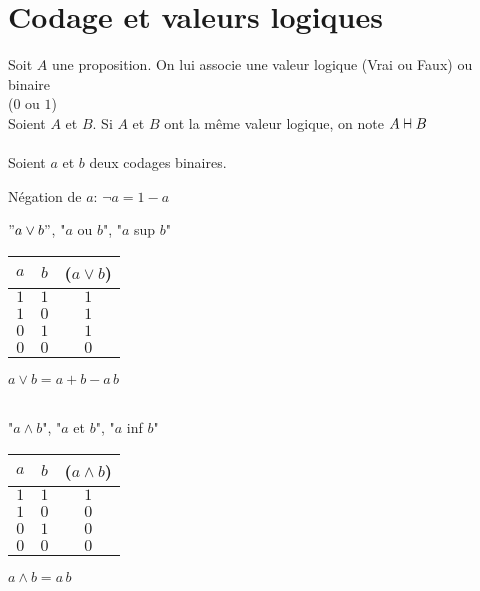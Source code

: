 \documentclass[12pt,twoside,a4paper]{article}
\author{MPSI 2}
\begin{document}
	\maketitle
	\section{Codage et valeurs logiques}
		Soit $A$ une proposition. On lui associe une valeur logique (Vrai ou Faux) ou binaire \\($0$ ou $1$)
		\\
		Soient $A$ et $B$. Si $A$ et $B$ ont la m\^eme valeur logique, on note $A\vdashv B$\\
		\\
		Soient $a$ et $b$ deux codages binaires.
		\begin{liste}
			\item N\'egation de $a$: $\neg a=1-a$\\
			\item $"a\vee b"$, "$a$ ou $b$", "$a$ sup $b$"\\
				\begin{tabular}{ c | c | c  }
					$a$ & $b$ &($a\vee b$)\\\hline 
					$1$&$1$&$1$\\
					$1$&$0$&$1$\\
					$0$&$1$&$1$\\
					$0$&$0$&$0$\\
				\end{tabular}
				$a\vee b=a+b-a\,b$\\\\
			\item "$a\land b$", "$a$ et $b$", "$a$ inf $b$"\\
				\begin{tabular}{ c | c | c  }
					$a$ & $b$ &($a\land b$)\\\hline 
					$1$&$1$&$1$\\
					$1$&$0$&$0$\\
					$0$&$1$&$0$\\
					$0$&$0$&$0$\\
				\end{tabular}
				$a\land b=a\,b$
		\end{liste}
\end{document}
